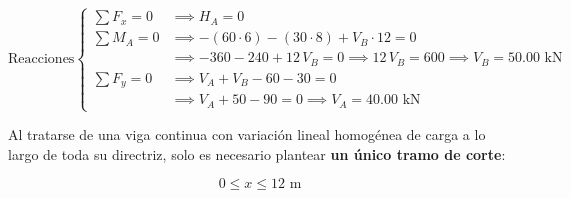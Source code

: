 \begin{equation}

    \text{Reacciones} \left\{

    \begin{aligned}

        \sum F_x = 0 & \implies \boxed{H_A = 0}                                                                        \\[6pt]

        \sum M_A = 0 & \implies -(60 \cdot 6) - (30 \cdot 8) + V_B \cdot 12 = 0                                        \\

                     & \implies -360 - 240 + 12\,V_B = 0 \implies 12\,V_B = 600 \implies \boxed{V_B = 50.00\text{ kN}} \\[6pt]

        \sum F_y = 0 & \implies V_A + V_B - 60 - 30 = 0                                                                \\

                     & \implies V_A + 50 - 90 = 0 \implies \boxed{V_A = 40.00\text{ kN}}

    \end{aligned}

    \right.

\end{equation}






Al tratarse de una viga continua con variación lineal homogénea de carga a lo largo de toda su directriz, solo es necesario plantear \textbf{un único tramo de corte}:

\begin{equation*}

    0 \le x \le 12\text{ m}

\end{equation*}



